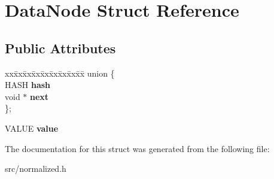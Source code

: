 \hypertarget{structDataNode}{}\section{Data\+Node Struct Reference}
\label{structDataNode}
\subsection*{Public Attributes}
\begin{DoxyCompactItemize}
\item 
\mbox{\label{structDataNode_aeb1ccdc92736a6833d240f2fb9dc000c}} 
\begin{tabbing}
xx\=xx\=xx\=xx\=xx\=xx\=xx\=xx\=xx\=\kill
union \{\\
\>HASH {\bfseries hash}\\
\>void $\ast$ {\bfseries next}\\
\}; \\

\end{tabbing}\item 
\mbox{\label{structDataNode_ab92b33d4fade9c2e01f56cb4015538a4}} 
V\+A\+L\+UE {\bfseries value}
\end{DoxyCompactItemize}


The documentation for this struct was generated from the following file\+:\begin{DoxyCompactItemize}
\item 
src/normalized.\+h\end{DoxyCompactItemize}
